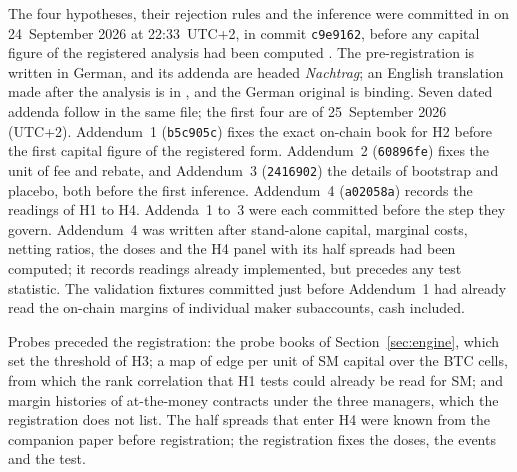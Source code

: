 \documentclass[a4paper,fleqn]{cas-dc}
\begin{document}
The four hypotheses, their rejection rules and the inference were committed in
 on 24~September 2026 at 22:33~UTC+2, in commit \texttt{c9e9162}, before
any capital figure of the registered analysis had been computed \citep{burlig2018}. The pre-registration is
written in German, and its addenda are headed \emph{Nachtrag}; an English translation made after the analysis is
in , and the German original is binding. Seven dated addenda follow in the same
file; the first four are of 25~September 2026 (UTC+2). Addendum~1 (\texttt{b5c905c}) fixes the exact on-chain book
for H2 before the first capital figure of the registered form. Addendum~2 (\texttt{60896fe})
fixes the unit of fee and rebate, and Addendum~3 (\texttt{2416902}) the details of bootstrap and placebo, both
before the first inference. Addendum~4 (\texttt{a02058a}) records the readings of H1 to H4. Addenda~1 to~3 were
each committed before the step they govern. Addendum~4 was written after stand-alone capital, marginal costs, netting
ratios, the doses and the H4 panel with its half spreads had been computed; it records readings already
implemented, but precedes any test statistic. The validation fixtures committed just before Addendum~1 had already
read the on-chain margins of individual maker subaccounts, cash included.

Probes preceded the registration: the probe books of Section~\ref{sec:engine}, which set the threshold of H3;
a map of edge per unit of SM capital over the BTC cells, from which the rank correlation that H1 tests could
already be read for SM; and margin histories of at-the-money contracts under the three managers, which the
registration does not list. The half spreads that enter H4 were known from the companion
paper before registration; the registration fixes the doses, the events and the test.
\end{document}
